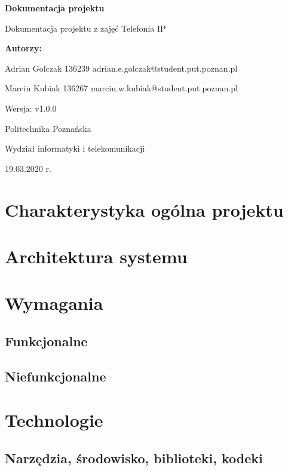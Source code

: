 \documentclass{article}
\newcommand{\version}{v1.0.0}
\begin{document}
\begin{titlepage}
		\begin{center}
		
			\huge
			\textbf{Dokumentacja projektu}
			
			\vspace{0.5cm}
			
			\large
			Dokumentacja projektu z zajęć Telefonia IP
			
			\vspace{2.4cm}
			
			\LARGE
			\textbf{Autorzy:}
			
			\vspace{0.3cm}
			
			Adrian Golczak 136239
			adrian.e.golczak@student.put.poznan.pl
			
			\vspace{0.3cm}
			
			Marcin Kubiak 136267
			marcin.w.kubiak@student.put.poznan.pl
			
			\vfill
			
			\normalsize
			Wersja: \version
			
			\vspace{2cm}
			
			\LARGE
			Politechnika Poznańska
					
			\vspace{0.3cm}
			
			\large
			Wydział informatyki i telekomunikacji
			
			\vspace{0.6cm}
			
			19.03.2020 r.
			
		\end{center}
\end{titlepage}
\tableofcontents
\newpage
\section{Charakterystyka ogólna projektu}

\section{Architektura systemu}

\section{Wymagania}
\subsection{Funkcjonalne}

\subsection{Niefunkcjonalne}

\section{Technologie}
\subsection{Narzędzia, środowisko, biblioteki, kodeki}

\end{document}
